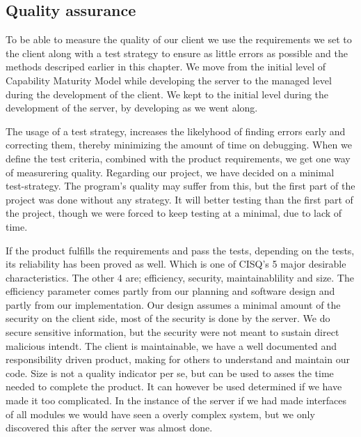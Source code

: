 \subsection{Quality assurance}
To be able to measure the quality of our client we use the requirements we set to the client along with a test strategy to ensure as little errors as possible and the methods descriped earlier in this chapter. We move from the initial level of Capability Maturity Model while developing the server to the managed level during the development of the client. We kept to the initial level during the development of the server, by developing as we went along.

The usage of a test strategy, increases the likelyhood of finding errors early and correcting them, thereby minimizing the amount of time on debugging. When we define the test criteria, combined with the product requirements, we get one way of measurering quality.
Regarding our project, we have decided on a minimal test-strategy. The program's quality may suffer from this, but the first part of the project was done without any strategy. It will better testing than the first part of the project, though we were forced to keep testing at a minimal, due to lack of time.

 If the product fulfills the requirements and pass the tests, depending on the tests, its reliability has been proved as well. Which is one of CISQ's 5 major desirable characteristics. The other 4 are; efficiency, security, maintainablility and size. The efficiency parameter comes partly from our planning and software design and partly from our implementation.
 Our design assumes a minimal amount of the security on the client side, most of the security is done by the server. We do secure sensitive information, but the security were not meant to sustain direct malicious intendt.
 The client is maintainable, we have a well documented and responsibility driven product, making for others to understand and maintain our code. 
 Size is not a quality indicator per se, but can be used to asses the time needed to complete the product. It can however be used determined if we have made it too complicated. In the instance of the server if we had made interfaces of all modules we would have seen a overly complex system, but we only discovered this after the server was almost done.
